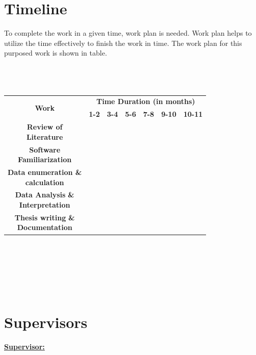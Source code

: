 \documentclass[12pt,a4paper]{article}
\begin{document}
\section{Timeline}
To complete the work in a given time, work plan is needed. Work plan helps to utilize the time effectively to finish the work in time. The work plan for this purposed work is shown in table.\\\\\\\
\setlength{\tabcolsep}{17pt}
\begin{tabular}{|c|c|c|c|c|c|c|}
	
	\hline
	\multirow{2}{*}{\textbf{Work}} &\multicolumn{6}{|c|}{\textbf{Time Duration (in months)}}	\\	
	\cline{2-7}
	{}	&\textbf{1-2 }&	\textbf{3-4}&\textbf{	5-6 }&	\textbf{7-8 }&\textbf{9-10}&\textbf{10-11}\\
	
	\hline
	\makecell{	\textbf{Review of}\\\textbf{Literature}}&	\cellcolor{red!100}& \cellcolor{red!100}& & &&\\
	\hline
	\makecell{\textbf{Software} \\\textbf{Familiarization}}& &	\cellcolor{blue!100}&\cellcolor{blue!100}&&&\\
	\hline
	\makecell{\textbf{Data enumeration \&} \\ \textbf{calculation}}&&&	\cellcolor{green!100}&\cellcolor{green!100}&&\\
	\hline
	\makecell{\textbf{Data Analysis} \textbf{\&} \\\textbf{Interpretation}}&&&\cellcolor{black!100}&	\cellcolor{black!100}&\cellcolor{black!100}&\\
	\hline
	\makecell{\textbf{Thesis writing} \textbf{\&} \\ \textbf{Documentation}}&&&&&	\cellcolor{cyan!100}&\cellcolor{cyan!100}\\
	\hline
	
\end{tabular}\\\\\\\\\

	\pagebreak
	
	
     \pagebreak 

	\section*{Supervisors}
	\textbf{\underline{Supervisor:}}\vspace*{0.4cm}\\
 
\end{document}
